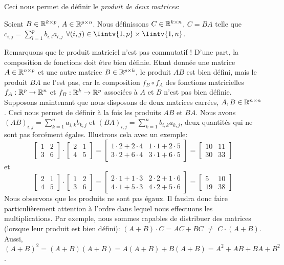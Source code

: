 \noindent Ceci nous permet de définir le \textit{produit de deux matrices}: 
\begin{boxdef}
Soient $B \in \mathbb{R}^{k \times p}$, $A \in \mathbb{R}^{p \times n}$. Nous définissons $C \in \mathbb{R}^{k \times n}$, $C = BA$ telle que $\displaystyle c_{i,j} = \sum_{l=1}^{p} b_{i,l} a_{l,j}$ $\forall (i,j) \in \Iintv{1,p} \times \Iintv{1, n}$.
\end{boxdef}

\noindent Remarquons que le produit matriciel n'est pas commutatif ! D'une part, la composition de fonctions doit être bien définie. Etant donnée une matrice $A \in \mathbb{R}^{n \times p}$ et une autre matrice $B \in \mathbb{R}^{p \times k}$, le produit $AB$ est bien défini, mais le produit $BA$ ne l'est pas, car la composition $f_B \circ f_A$ des fonctions matricielles $f_A: \mathbb{R}^p \to \mathbb{R}^n$ et $f_B: \mathbb{R}^k \to \mathbb{R}^p$ associées à $A$ et $B$ n'est pas bien définie.\\

\noindent Supposons maintenant que nous disposons de deux matrices carrées, $A, B \in \mathbb{R}^{n \times n}$. Ceci nous permet de définir à la fois les produits $AB$ et $BA$. Nous avons $\displaystyle (AB)_{i,j} = \sum_{k=1}^{n} a_{i,k} b_{k,j}$ et $\displaystyle (BA)_{i,j} = \sum_{k=1}^{n} b_{i,k} a_{k,j}$, deux quantités qui ne sont pas forcément égales. Illustrons cela avec un exemple:
$$\begin{bmatrix} 1 & 2 \\ 3 & 6 \end{bmatrix} \cdot \begin{bmatrix} 2 & 1 \\ 4 & 5 \end{bmatrix} = \begin{bmatrix} 1\cdot 2 + 2 \cdot 4 & 1\cdot 1 + 2\cdot 5 \\ 3\cdot 2 + 6\cdot 4 & 3\cdot 1 + 6\cdot 5 \end{bmatrix} = \begin{bmatrix} 10 & 11 \\ 30 & 33 \end{bmatrix}$$
et
$$\begin{bmatrix} 2 & 1 \\ 4 & 5 \end{bmatrix} \cdot \begin{bmatrix} 1 & 2 \\ 3 & 6 \end{bmatrix} = \begin{bmatrix} 2\cdot 1 + 1\cdot 3 & 2\cdot 2 + 1\cdot 6 \\ 4\cdot 1 + 5\cdot 3 & 4\cdot 2 + 5\cdot 6 \end{bmatrix} = \begin{bmatrix} 5 & 10 \\ 19 & 38 \end{bmatrix}$$
Nous observons que les produits ne sont pas égaux. Il faudra donc faire particulièrement attention à l'ordre dans lequel nous effectuons les multiplications. Par exemple, nous sommes capables de distribuer des matrices (lorsque leur produit est bien défini): $(A+B) \cdot C = AC + BC$ \textbf{$\neq$} $C \cdot (A+B)$. Aussi, $(A+B)^2 = (A+B)(A+B) = A(A+B) + B(A+B) = A^2 + AB + BA + B^2$.\\

